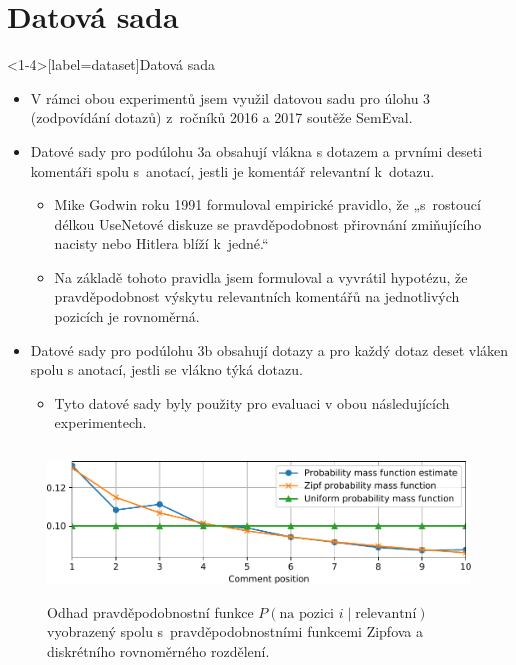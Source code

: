 \documentclass[aspectratio=169,t]{beamer}
\begin{document}
\section{Datová sada}
\begin{frame}<1-4>[label=dataset]{Datová sada}
\begin{itemize}
\item<1-> V rámci obou experimentů jsem využil datovou sadu pro úlohu 3
  (zodpovídání dotazů) z~ročníků 2016 a 2017 soutěže SemEval.
\item<2-> Datové sady pro podúlohu 3a obsahují \alert<2-6>{vlákna s dotazem a
  prvními deseti komentáři} spolu s~anotací, jestli \alert<2-6>{je komentář
  relevantní k~dotazu}.
  \begin{itemize}
    \item<3-> Mike Godwin roku 1991 formuloval empirické pravidlo, že
      „s~rostoucí délkou UseNetové diskuze se pravděpodobnost přirovnání
      zmiňujícího nacisty nebo Hitlera blíží k~jedné.“
    \item<4-> Na základě tohoto pravidla jsem formuloval a vyvrátil hypotézu, že
      \alert<4>{pravděpodobnost výskytu relevantních komentářů na jednotlivých
      pozicích je rovnoměrná}.
  \end{itemize}
\item<5-> Datové sady pro podúlohu 3b obsahují dotazy a \alert<5-6>{pro každý
  dotaz deset vláken} spolu s anotací, jestli se \alert<5-6>{vlákno týká dotazu}.
  \begin{itemize}
    \item<6-> Tyto datové sady byly použity pro evaluaci v obou následujících
      experimentech.
  \end{itemize}
\end{itemize}
\end{frame}

\begin{frame}[c]
\begin{figure}
\vfill
\begin{center}
\includegraphics[height=4cm]{figs/quality-evaluation-1.pdf}
\caption{Odhad pravděpodobnostní funkce $P(\text{na pozici }i\mid\text{relevantní})$
  vyobrazený spolu s~pravděpodobnostními funkcemi Zipfova a diskrétního
  rovnoměrného rozdělení.}
\end{center}
\end{figure}
\end{frame}
\end{document}
